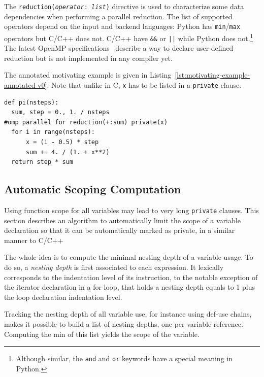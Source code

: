 \documentclass[conference]{IEEEtran}
\begin{document}
The \texttt{reduction(\emph{operator}: \emph{list})} directive is used to
characterize some data dependencies when performing a parallel reduction. The
list of supported operators depend on the input and backend languages: Python
has \texttt{min}/\texttt{max} operators but C/C++ does not. %
C/C++ have
\texttt{\&\&} or \texttt{||} while Python does not.\footnote{Although similar,
the \texttt{and} and \texttt{or} keywords have a special meaning in Python.} The
latest OpenMP specifications~\cite{openmp4} describe a way to declare
user-defined reduction but is not implemented in any compiler yet.

The annotated motivating example is given in
Listing~\ref{lst:motivating-example-annotated-v0}. Note that unlike in C,
\texttt{x} has to be listed in a \texttt{private} clause.

\begin{lstlisting}[float, label={lst:motivating-example-annotated-v0},
  caption={Motivating example: computing $\pi$ in Python with OpenMP.}]
def pi(nsteps):
  sum, step = 0., 1. / nsteps
#omp parallel for reduction(+:sum) private(x)
  for i in range(nsteps):
      x = (i - 0.5) * step
      sum += 4. / (1. + x**2)
  return step * sum
\end{lstlisting}

\subsection{Automatic Scoping Computation}

Using function scope for all variables may lead to very long \texttt{private}
clauses. This section describes an algorithm to automatically limit the scope of
a variable declaration so that it can be automatically marked as private, in
a similar manner to C/C++

The whole idea is to compute the minimal nesting depth of a variable usage. To
do so, a \emph{nesting depth} is first associated to each expression. It
lexically corresponds to the indentation level of its instruction, to the
notable exception of the iterator declaration in a for loop, that holds a
nesting depth equals to 1 plus the loop declaration indentation level.

Tracking the nesting depth of all variable use, for instance using def-use %
chains, makes it possible to build a list of nesting depths, one per variable
reference. Computing the min of this list yields the scope of the variable.
\end{document}
